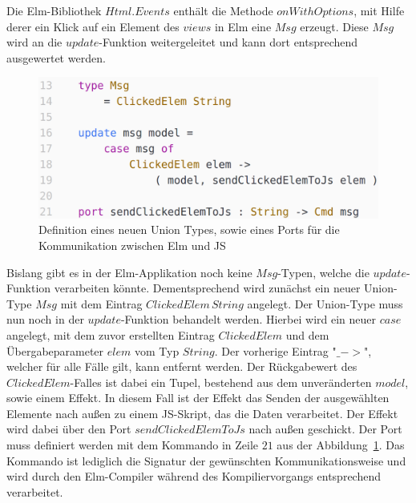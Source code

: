 Die Elm-Bibliothek $Html.Events$ enthält die Methode $onWithOptions$, mit Hilfe derer ein Klick auf ein Element des $views$ in Elm eine $Msg$ erzeugt. Diese $Msg$ wird an die $update$-Funktion weitergeleitet und kann dort entsprechend ausgewertet werden.
\begin{figure}[htb]
\centering
\includegraphics[scale=0.3]{img/elm-port.png}
\caption{Definition eines neuen Union Types, sowie eines Ports für die Kommunikation zwischen Elm und \ac{JS}}\label{fig:create-port}
\end{figure}
Bislang gibt es in der Elm-Applikation noch keine $Msg$-Typen, welche die $update$-Funktion verarbeiten könnte. Dementsprechend wird zunächst ein neuer Union-Type $Msg$ mit dem Eintrag $ClickedElem\,String$ angelegt. Der Union-Type muss nun noch in der $update$-Funktion behandelt werden. Hierbei wird ein neuer $case$ angelegt, mit dem zuvor erstellten Eintrag $ClickedElem$ und dem Übergabeparameter $elem$ vom Typ $String$. Der vorherige Eintrag "$\_ ->$", welcher für alle Fälle gilt, kann entfernt werden. Der Rückgabewert des $ClickedElem$-Falles ist dabei ein Tupel, bestehend aus dem unveränderten $model$, sowie einem Effekt. In diesem Fall ist der Effekt das Senden der ausgewählten Elemente nach außen zu einem \ac{JS}-Skript, das die Daten verarbeitet. Der Effekt wird dabei über den Port $sendClickedElemToJs$ nach außen geschickt. Der Port muss definiert werden mit dem Kommando in Zeile $21$ aus der Abbildung~\ref{fig:create-port}. Das Kommando ist lediglich die Signatur der gewünschten Kommunikationsweise und wird durch den Elm-Compiler während des Kompiliervorgangs entsprechend verarbeitet.
